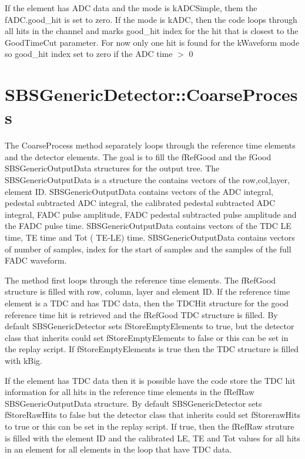 \documentclass[11pt]{article}
\begin{document}
If the element has ADC data and the mode is kADCSimple, them the  fADC.good\_hit is set to zero.
If the mode is kADC, then the code loops through all hits in the channel and marks
good\_hit index for the hit that is closest  to the GoodTimeCut parameter.
{\color{red} For now only one hit is found for the kWaveform mode so good\_hit index set to zero
if the ADC time $>$ 0}



\section{SBSGenericDetector::CoarseProcess}
The CoarseProcess method separately loops through the reference time elements and the detector elements.
The goal is to fill the fRefGood and the fGood SBSGenericOutputData structures for the output tree. The
SBSGenericOutputData is a structure the contains vectors of the row,col,layer, element ID.
SBSGenericOutputData contains vectors of the ADC integral, pedestal subtracted ADC integral, 
the calibrated   pedestal subtracted ADC integral, FADC pulse amplitude, FADC pedestal subtracted pulse amplitude
and the FADC pulse time. SBSGenericOutputData contains vectors of the TDC LE time, TE time and Tot ( TE-LE) time.
 SBSGenericOutputData contains vectors of  number of samples, index for the start of 
 samples and the samples of the full FADC waveform.
 
 The method first loops through the reference time elements. The fRefGood structure 
 is filled with row, column, layer and element ID. If the reference time element is
 a TDC and has TDC data, then the TDCHit structure for the good reference time hit is retrieved
 and the fRefGood TDC structure is filled.
 By default SBSGenericDetector sets fStoreEmptyElements to true, but the detector class that inherits 
 could set  fStoreEmptyElements to false or this can be set in the replay script.
  If  fStoreEmptyElements is true then the TDC structure is filled with kBig.
 
If the element has TDC data then it is possible have the code store the TDC hit information for
all hits in the reference time elements in the fRefRaw SBSGenericOutputData structure.
 By default SBSGenericDetector sets fStoreRawHits to false but the detector class that inherits 
 could set  fStorerawHits to true or this can be set in the replay script.
 If true, then the fRefRaw struture is filled with the element ID and the calibrated LE, TE and Tot values
 for all hits in an element for all elements in the loop that have TDC data.
 
\end{document}
